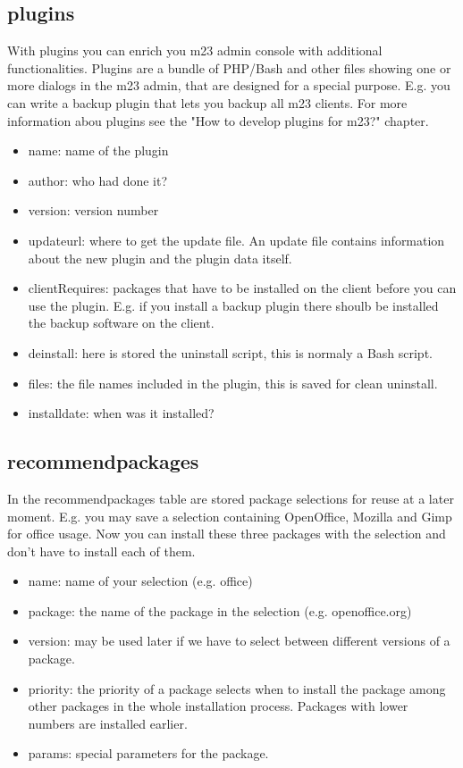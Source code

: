 \subsection{plugins}
With plugins you can enrich you m23 admin console with additional functionalities. Plugins are a bundle of PHP/Bash and other files showing one or more dialogs in the m23 admin, that are designed for a special purpose. E.g. you can write a backup plugin that lets you backup all m23 clients. For more information abou plugins see the "How to develop plugins for m23?" chapter.
\begin{itemize}
\item name: name of the plugin
\item author: who had done it?
\item version: version number
\item updateurl: where to get the update file. An update file contains information about the new plugin and the plugin data itself.
\item clientRequires: packages that have to be installed on the client before you can use the plugin. E.g. if you install a backup plugin there shoulb be installed the backup software on the client.
\item deinstall: here is stored the uninstall script, this is normaly a Bash script.
\item files: the file names included in the plugin, this is saved for clean uninstall.
\item installdate: when was it installed?
\end{itemize}

\subsection{recommendpackages}
In the recommendpackages table are stored package selections for reuse at a later moment. E.g. you may save a selection containing OpenOffice, Mozilla and Gimp for office usage. Now you can install these three packages with the selection and don't have to install each of them.
\begin{itemize}
\item name: name of your selection (e.g. office)
\item package: the name of the package in the selection (e.g. openoffice.org)
\item version: may be used later if we have to select between different versions of a package.
\item priority: the priority of a package selects when to install the package among other packages in the whole installation process. Packages with lower numbers are installed earlier.
\item params: special parameters for the package.
\end{itemize}

